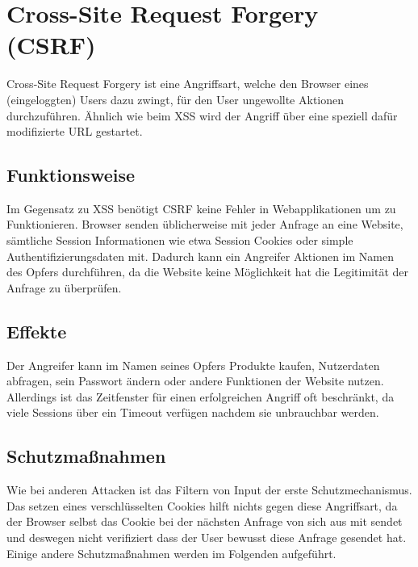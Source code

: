 \section{Cross-Site Request Forgery (CSRF)}
Cross-Site Request Forgery ist eine Angriffsart, welche den Browser eines (eingeloggten) Users dazu zwingt, f\"ur den User ungewollte Aktionen durchzuf\"uhren. \"Ahnlich wie beim XSS wird der Angriff \"uber eine speziell daf\"ur modifizierte URL gestartet.
\cite{hackingWebAppsBuch}

\subsection{Funktionsweise}
Im Gegensatz zu XSS ben\"otigt CSRF keine Fehler in Webapplikationen um zu Funktionieren. Browser senden \"ublicherweise mit jeder Anfrage an eine Website, s\"amtliche Session Informationen wie etwa Session Cookies oder simple Authentifizierungsdaten mit. Dadurch kann ein Angreifer Aktionen im Namen des Opfers durchf\"uhren, da die Website keine M\"oglichkeit hat die Legitimit\"at der Anfrage zu \"uberpr\"ufen. \cite{owaspCSRF}

\subsection{Effekte}
Der Angreifer kann im Namen seines Opfers Produkte kaufen, Nutzerdaten abfragen, sein Passwort \"andern oder andere Funktionen der Website nutzen. Allerdings ist das Zeitfenster f\"ur einen erfolgreichen Angriff oft beschr\"ankt, da viele Sessions \"uber ein Timeout verf\"ugen nachdem sie unbrauchbar werden. 
\cite{owaspCSRF} \cite{heiseRisiken}

\clearpage
\subsection{Schutzma{\ss}nahmen}
Wie bei anderen Attacken ist das Filtern von Input der erste Schutzmechanismus. Das setzen eines verschl\"usselten Cookies hilft nichts gegen diese Angriffsart, da der Browser selbst das Cookie bei der n\"achsten Anfrage von sich aus mit sendet und deswegen nicht verifiziert dass der User bewusst diese Anfrage gesendet hat. Einige andere Schutzma{\ss}nahmen werden im Folgenden aufgef\"uhrt.


